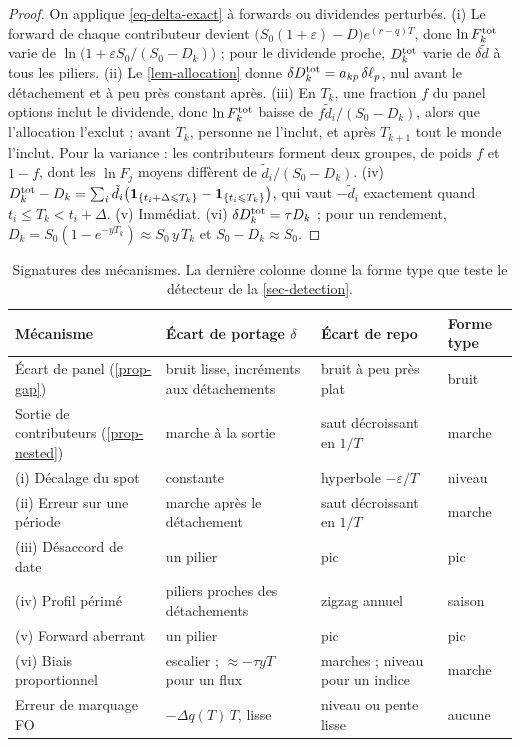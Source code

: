 \begin{proof}
On applique \eqref{eq-delta-exact} à forwards ou dividendes perturbés.
(i) Le forward de chaque contributeur devient $\bigl(S_0(1+\varepsilon)-D\bigr)e^{(r-q)T}$, donc $\ln F^{\mathrm{tot}}_k$ varie
de $\ln\bigl(1+\varepsilon S_0/(S_0-D_k)\bigr)$ ; pour le dividende proche, $D^{\mathrm{tot}}_k$ varie de $\delta\tilde d$ à
tous les piliers.
(ii) Le \cref{lem-allocation} donne $\delta D^{\mathrm{tot}}_k=a_{kp}\,\delta\ell_p$, nul avant le détachement et à peu près
constant après.
(iii) En $T_k$, une fraction $f$ du panel options inclut le dividende, donc $\ln F^{\mathrm{tot}}_k$ baisse de
$f\tilde d_i/(S_0-D_k)$, alors que l'allocation l'exclut ; avant $T_k$, personne ne l'inclut, et après $T_{k+1}$ tout
le monde l'inclut. Pour la variance : les contributeurs forment deux groupes, de poids $f$ et $1-f$, dont les $\ln F_j$
moyens diffèrent de $\tilde d_i/(S_0-D_k)$.
(iv) $D^{\mathrm{tot}}_k-D_k=\sum_i\tilde d_i\bigl(\mathbf{1}_{\{t_i+\Delta\leqslant T_k\}}-\mathbf{1}_{\{t_i\leqslant T_k\}}\bigr)$, qui vaut
$-\tilde d_i$ exactement quand $t_i\le T_k<t_i+\Delta$.
(v) Immédiat. (vi) $\delta D^{\mathrm{tot}}_k=\tau D_k$ ; pour un rendement, $D_k=S_0(1-e^{-yT_k})\approx S_0\,y\,T_k$ et
$S_0-D_k\approx S_0$.
\end{proof}

\begin{table}[ht]
\centering
\caption{Signatures des mécanismes. La dernière colonne donne la forme type que teste le détecteur de la
\cref{sec-detection}.}
\label{tab-signatures}
\small
\begin{tabular}{@{}>{\raggedright\arraybackslash}p{4.2cm}>{\raggedright\arraybackslash}p{4.3cm}
>{\raggedright\arraybackslash}p{3.6cm}l@{}}
\toprule
Mécanisme & Écart de portage $\delta$ & Écart de repo & Forme type\\
\midrule
Écart de panel (\ref{prop-gap}) & bruit lisse, incréments aux détachements & bruit à peu près plat & bruit\\
Sortie de contributeurs (\ref{prop-nested}) & marche à la sortie & saut décroissant en $1/T$ & marche\\
(i) Décalage du spot & constante & hyperbole $-\varepsilon/T$ & niveau\\
(ii) Erreur sur une période & marche après le détachement & saut décroissant en $1/T$ & marche\\
(iii) Désaccord de date & un pilier & pic & pic\\
(iv) Profil périmé & piliers proches des détachements & zigzag annuel & saison\\
(v) Forward aberrant & un pilier & pic & pic\\
(vi) Biais proportionnel & escalier ; $\approx-\tau yT$ pour un flux & marches ; niveau pour un indice & marche\\
Erreur de marquage FO & $-\Delta q(T)\,T$, lisse & niveau ou pente lisse & aucune\\
\bottomrule
\end{tabular}
\end{table}


